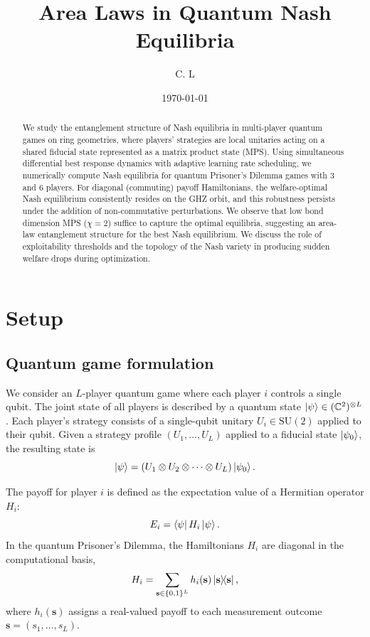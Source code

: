 \documentclass[12pt]{article}
\title{Area Laws in Quantum Nash Equilibria}
\author{C. L}
\date{\today}
\begin{document}
\maketitle

\begin{abstract}
We study the entanglement structure of Nash equilibria in multi-player quantum games
on ring geometries, where players' strategies are local unitaries acting on a shared fiducial state
represented as a matrix product state (MPS).
Using simultaneous differential best response dynamics with adaptive learning rate scheduling,
we numerically compute Nash equilibria for quantum Prisoner's Dilemma games with 3 and 6 players.
For diagonal (commuting) payoff Hamiltonians, the welfare-optimal Nash equilibrium consistently
resides on the GHZ orbit, and this robustness persists under the addition of non-commutative perturbations.
We observe that low bond dimension MPS ($\chi = 2$) suffice to capture the optimal equilibria,
suggesting an area-law entanglement structure for the best Nash equilibrium.
We discuss the role of exploitability thresholds and the topology of the Nash variety
in producing sudden welfare drops during optimization.
\end{abstract}

\section{Setup}
\label{sec:setup}

\subsection{Quantum game formulation}

We consider an $L$-player quantum game where each player $i$ controls a single qubit.
The joint state of all players is described by a quantum state $\ket{\psi} \in (\mathbb{C}^2)^{\otimes L}$.
Each player's strategy consists of a single-qubit unitary $U_i \in \mathrm{SU}(2)$ applied to their qubit.
Given a strategy profile $(U_1, \ldots, U_L)$ applied to a fiducial state $\ket{\psi_0}$, the resulting state is
\begin{equation}
    \ket{\psi} = (U_1 \otimes U_2 \otimes \cdots \otimes U_L) \ket{\psi_0}.
\end{equation}

The payoff for player $i$ is defined as the expectation value of a Hermitian operator $H_i$:
\begin{equation}
    \label{eq:payoff}
    E_i = \bra{\psi} H_i \ket{\psi}.
\end{equation}
In the quantum Prisoner's Dilemma, the Hamiltonians $H_i$ are diagonal in the computational basis,
\begin{equation}
    H_i = \sum_{\mathbf{s} \in \{0,1\}^L} h_i(\mathbf{s}) \ketbra{\mathbf{s}}{\mathbf{s}},
\end{equation}
where $h_i(\mathbf{s})$ assigns a real-valued payoff to each measurement outcome $\mathbf{s} = (s_1, \ldots, s_L)$.
\end{document}
